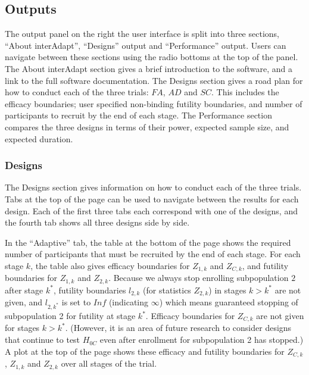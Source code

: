 \documentclass[article]{jss}
\begin{document}
\subsection{Outputs}
\label{sub:outputs}

The output panel on the right the user interface is split into three sections, ``About interAdapt'', ``Designs'' output and ``Performance'' output. Users can navigate between these sections using the radio bottoms at the top of the panel. The About interAdapt section gives a brief introduction to the software, and a link to the full software documentation. The Designs section gives a road plan for how to conduct each of the three trials: $FA$, $AD$ and $SC$. This includes the efficacy boundaries; user specified non-binding futility boundaries, and number of participants to recruit by the end of each stage. The Performance section compares the three designs in terms of their power, expected sample size, and expected duration. 



\subsubsection{Designs}
\label{sub:design}

The Designs section gives information on how to conduct each of the three trials. Tabs at the top of the page can be used to navigate between the results for each design. Each of the first three tabs each correspond with one of the designs, and the fourth tab shows all three designs side by side. 

In the ``Adaptive'' tab, the table at the bottom of the page shows the required number of participants that must be recruited by the end of each stage. For each stage $k$, the table also gives efficacy boundaries for $Z_{1,k}$ and $Z_{C,k}$, and futility boundaries for $Z_{1,k}$ and $Z_{2,k}$. Because we always stop enrolling subpopulation $2$ after stage $k^*$, futility boundaries $l_{2,k}$ (for statistics $Z_{2,k}$) in stages $k>k^*$  are not given, and $l_{2,k^*}$ is set to $Inf$ (indicating $\infty$) which means guaranteed stopping of subpopulation 2 for futility at stage $k^*$. 
Efficacy boundaries for $Z_{C,k}$ are not given for stages $k>k^*$. (However, it is an area of future research to consider designs that continue to test $H_{0C}$ even after enrollment for subpopulation 2 has stopped.) A plot at the top of the page shows these efficacy and futility boundaries for $Z_{C,k}$, $Z_{1,k}$ and $Z_{2,k}$ over all stages of the trial.
\end{document}
